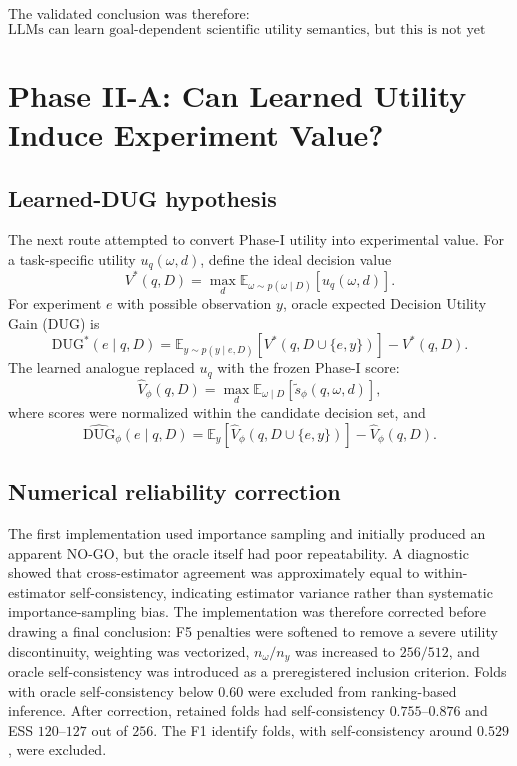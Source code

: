 \documentclass[11pt]{article}
\newcommand{\E}{\mathbb{E}}
\begin{document}
The validated conclusion was therefore:
\[
\boxed{\text{LLMs can learn goal-dependent scientific utility semantics, but this is not yet experiment design.}}
\]

\section{Phase II-A: Can Learned Utility Induce Experiment Value?}
\subsection{Learned-DUG hypothesis}
The next route attempted to convert Phase-I utility into experimental value. For a task-specific utility $u_q(\omega,d)$, define the ideal decision value
\[
V^*(q,D)=\max_d\E_{\omega\sim p(\omega\mid D)}[u_q(\omega,d)].
\]
For experiment $e$ with possible observation $y$, oracle expected Decision Utility Gain (DUG) is
\[
\mathrm{DUG}^*(e\mid q,D)
=
\E_{y\sim p(y\mid e,D)}
\left[V^*(q,D\cup\{e,y\})\right]-V^*(q,D).
\]
The learned analogue replaced $u_q$ with the frozen Phase-I score:
\[
\widehat V_\phi(q,D)
=\max_d\E_{\omega\mid D}[\widetilde s_\phi(q,\omega,d)],
\]
where scores were normalized within the candidate decision set, and
\[
\widehat{\mathrm{DUG}}_\phi(e\mid q,D)
=
\E_y[\widehat V_\phi(q,D\cup\{e,y\})]-\widehat V_\phi(q,D).
\]

\subsection{Numerical reliability correction}
The first implementation used importance sampling and initially produced an apparent NO-GO, but the oracle itself had poor repeatability. A diagnostic showed that cross-estimator agreement was approximately equal to within-estimator self-consistency, indicating estimator variance rather than systematic importance-sampling bias. The implementation was therefore corrected before drawing a final conclusion: F5 penalties were softened to remove a severe utility discontinuity, weighting was vectorized, $n_\omega/n_y$ was increased to $256/512$, and oracle self-consistency was introduced as a preregistered inclusion criterion. Folds with oracle self-consistency below $0.60$ were excluded from ranking-based inference. After correction, retained folds had self-consistency $0.755$--$0.876$ and ESS $120$--$127$ out of $256$. The F1 identify folds, with self-consistency around $0.529$, were excluded.
\end{document}
